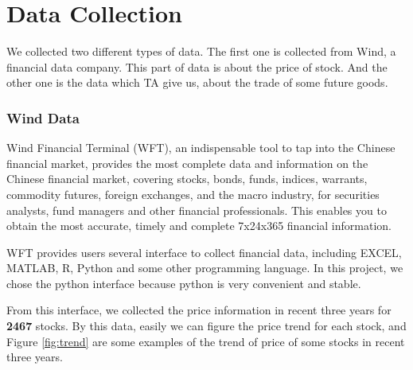 \section{Data Collection}
\label{sec:data-collection}
We collected two different types of data. The first one is collected from Wind, a financial data company. This part of data is about the price of stock. And the other one is the data which TA give us, about the trade of some future goods.

\subsubsection{Wind Data}
Wind Financial Terminal (WFT), an indispensable tool to tap into the Chinese financial market, provides the most complete data and information on the Chinese financial market, covering stocks, bonds, funds, indices, warrants, commodity futures, foreign exchanges, and the macro industry, for securities analysts, fund managers and other financial professionals. This enables you to obtain the most accurate, timely and complete 7x24x365 financial information.

WFT provides users several interface to collect financial data, including EXCEL, MATLAB, R, Python and some other programming language. In this project, we chose the python interface because python is very convenient and stable.

From this interface, we collected the price information in recent three years for \textbf{2467} stocks. By this data, easily we can figure the price trend for each stock, and Figure \ref{fig:trend} are some examples of the trend of price of some stocks in recent three years.

